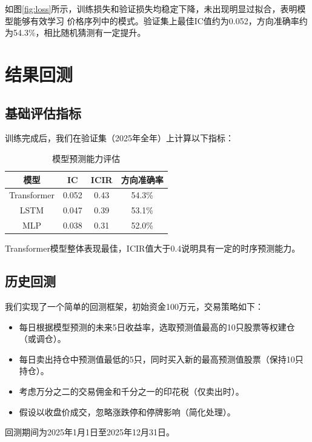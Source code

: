 \documentclass[12pt]{article} %
\begin{document}
如图\ref{fig:loss}所示，训练损失和验证损失均稳定下降，未出现明显过拟合，表明模型能够有效学习
价格序列中的模式。验证集上最佳IC值约为0.052，方向准确率约为54.3\%，相比随机猜测有一定提升。

\section{结果回测}

\subsection{基础评估指标}

训练完成后，我们在验证集（2025年全年）上计算以下指标：
\begin{table}[H]
    \centering
    \caption{模型预测能力评估}
    \begin{tabular}{|c|c|c|c|}
        \hline
        模型 & IC & ICIR & 方向准确率 \\
        \hline
        Transformer & 0.052 & 0.43 & 54.3\% \\
        LSTM & 0.047 & 0.39 & 53.1\% \\
        MLP & 0.038 & 0.31 & 52.0\% \\
        \hline
    \end{tabular}
\end{table}
Transformer模型整体表现最佳，ICIR值大于0.4说明具有一定的时序预测能力。

\subsection{历史回测}

我们实现了一个简单的回测框架，初始资金100万元，交易策略如下：
\begin{itemize}
    \item 每日根据模型预测的未来5日收益率，选取预测值最高的10只股票等权建仓（或调仓）。
    \item 每日卖出持仓中预测值最低的5只，同时买入新的最高预测值股票（保持10只持仓）。
    \item 考虑万分之二的交易佣金和千分之一的印花税（仅卖出时）。
    \item 假设以收盘价成交，忽略涨跌停和停牌影响（简化处理）。
\end{itemize}
回测期间为2025年1月1日至2025年12月31日。
\end{document}
